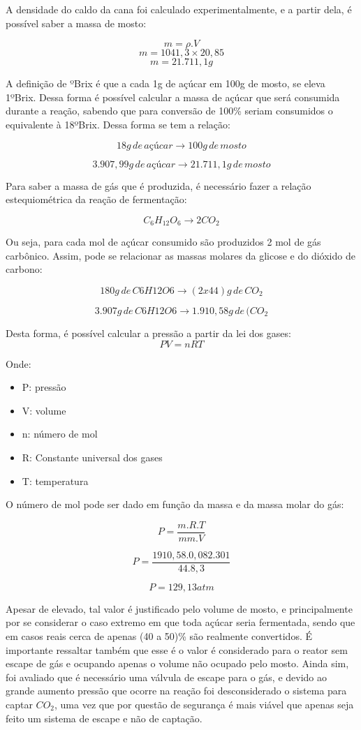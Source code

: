 A densidade do caldo da cana foi calculado experimentalmente, e a partir dela, é possível saber a massa de mosto:

\[m=\rho.V\]
\[m = 1041,3 \times 20,85\]
\[m = 21.711,1 g\]

A definição de ºBrix é que a cada 1g de açúcar em 100g de mosto, se eleva 1ºBrix. Dessa forma é possível calcular a massa de açúcar que será consumida durante a reação, sabendo que para conversão de 100\% seriam consumidos o equivalente à 18ºBrix. Dessa forma se tem a relação:

\[18g \,de\, açúcar \rightarrow 100g \,de\, mosto\]

\[3.907,99 g \,de\, açúcar \rightarrow 21.711,1 g \,de\, mosto\]

Para saber a massa de gás que é produzida, é necessário fazer a relação estequiométrica da reação de fermentação:

\[C_{6}H_{12}O_{6}\rightarrow 2CO_{2}\]

Ou seja, para cada mol de açúcar consumido são produzidos 2 mol de gás carbônico. Assim, pode se relacionar as massas molares da glicose e do dióxido de carbono:

\[180 g \,de\, C6H12O6 \rightarrow (2x44) g \,de\, CO_{2}\]

\[3.907g \,de\, C6H12O6 \rightarrow 1.910,58 g \,de\, (CO_{2}\]

Desta forma, é possível calcular a pressão a partir da lei dos gases:
\[PV = nRT\]

Onde:

\begin{itemize}
	\item P: pressão
	\item V: volume
	\item n: número de mol
	\item R: Constante universal dos gases
	\item T: temperatura
\end{itemize}

O número de mol pode ser dado em função da massa e da massa molar do gás:

\[P = \frac{m.R.T}{mm.V}\]

\[P = \frac{1910,58 .0,082.301 }{44.8,3}\]

\[P = 129,13 atm\]


Apesar de elevado, tal valor é justificado pelo volume de mosto, e principalmente por se considerar o caso extremo em que toda açúcar seria fermentada, sendo que em casos reais cerca de apenas (40 a 50)\% são realmente convertidos. É importante ressaltar também que esse é o valor é considerado para o reator sem escape de gás e ocupando apenas o volume não ocupado pelo mosto. Ainda sim, foi avaliado que é necessário uma válvula de escape para o gás, e devido ao grande aumento pressão que ocorre na reação foi desconsiderado o sistema para captar \(CO_{2}\), uma vez que por questão de segurança é mais viável que apenas seja feito um sistema de escape e não de captação.

